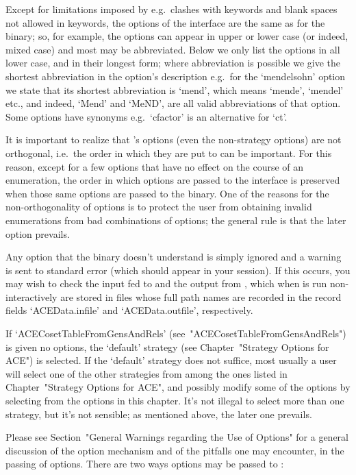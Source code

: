 Except for limitations imposed by {\GAP}  e.g.\  clashes  with  {\GAP}
keywords and blank spaces not allowed in keywords, the options of  the
{\ACE} interface are the same as for the binary; so, for example,  the
options can appear in upper or lower case (or indeed, mixed case)  and
most may be abbreviated. Below we only list the options in  all  lower
case, and in their longest form; where  abbreviation  is  possible  we
give the shortest abbreviation in the  option's  description  e.g.~for
the `mendelsohn' option we state that  its  shortest  abbreviation  is
`mend', which means `mende', `mendel' etc.,  and  indeed,  `Mend'  and
`MeND', are all valid abbreviations of that option. Some options  have
synonyms e.g.~`cfactor' is an alternative for `ct'.

It  is  important  to  realize  that  {\ACE}'s   options   (even   the
non-strategy options) are not orthogonal, i.e.\  the  order  in  which
they are put to {\ACE} can be important. For this reason, except for a
few options that have no effect on the course of an  enumeration,  the
order in which options are passed to the {\ACE} interface is preserved
when those same options are passed to the {\ACE} binary.  One  of  the
reasons for the non-orthogonality of options is to  protect  the  user
from obtaining invalid enumerations from bad combinations of  options;
the general rule is that the later option prevails.

Any option that the {\ACE} binary doesn't understand is simply ignored
and a warning is sent to standard error (which should appear  in  your
{\GAP} session). If this occurs, you may wish to check the  input  fed
to {\ACE} and the  output  from  {\ACE},  which  when  {\ACE}  is  run
non-interactively are stored  in  files  whose  full  path  names  are
recorded in the record fields `ACEData.infile' and  `ACEData.outfile',
respectively.

If `ACECosetTableFromGensAndRels' (see~"ACECosetTableFromGensAndRels")
is given no options, the  `default'  strategy  (see  Chapter~"Strategy
Options for ACE") is selected. If  the  `default'  strategy  does  not
suffice, most usually a user will select one of the  other  strategies
from among the ones listed in Chapter~"Strategy Options for ACE",  and
possibly modify some of the options by selecting from the  options  in
this chapter. It's not illegal to select more than one  strategy,  but
it's not sensible; as mentioned above, the later one prevails.

Please see Section~"General Warnings regarding the Use of Options" for
a general discussion of the option mechanism and of the  pitfalls  one
may encounter, in the passing of options. There are two  ways  options
may be passed to {\ACE}:

